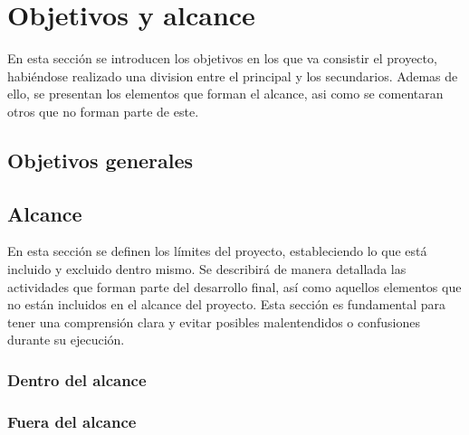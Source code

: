 \section{Objetivos y alcance}
En esta sección se introducen los objetivos en los que va consistir el
proyecto, habiéndose realizado una division entre el principal y los
secundarios. Ademas de ello, se presentan los elementos que forman el alcance,
asi como se comentaran otros que no forman parte de este.

\subsection{Objetivos generales}

\subsection{Alcance}
En esta sección se definen los límites del proyecto, estableciendo lo que está
incluido y excluido dentro mismo. Se describirá de manera detallada las
actividades que forman parte del desarrollo final, así como aquellos elementos
que no están incluidos en el alcance del proyecto. Esta sección es fundamental
para tener una comprensión clara y evitar posibles malentendidos o confusiones
durante su ejecución.

\subsubsection{Dentro del alcance}
\subsubsection{Fuera del alcance}

\pagebreak